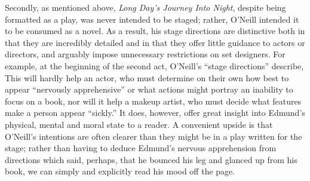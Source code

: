 \documentclass[letterpaper, 12pt]{article}
\newcommand{\ldjin}{\textit{Long Day's Journey Into Night}}
\newcommand{\oneill}{O'Neill}
\begin{document}
Secondly, as mentioned above, \ldjin{}, despite being formatted as a play, was
never intended to be staged; rather, \oneill{} intended it to be consumed as a
novel. As a result, his stage directions are distinctive both in that they are
incredibly detailed and in that they offer little guidance to actors or
directors, and arguably impose unnecessary restrictions on set designers. For
example, at the beginning of the second act, \oneill{}'s \enquote{stage
  directions} describe,  This will hardly help an actor, who must determine on
their own how best to appear \enquote{nervously apprehensive} or what actions
might portray an inability to focus on a book, nor will it help a makeup
artist, who must decide what features make a person appear \enquote{sickly.} It
does, however, offer great insight into Edmund's physical, mental and moral
state to a reader. A convenient upside is that \oneill{}'s intentions are often
clearer than they might be in a play written for the stage; rather than having
to deduce Edmund's nervous apprehension from directions which said, perhaps,
that he bounced his leg and glanced up from his book, we can simply and
explicitly read his mood off the page.

\printbibliography{}
\end{document}
